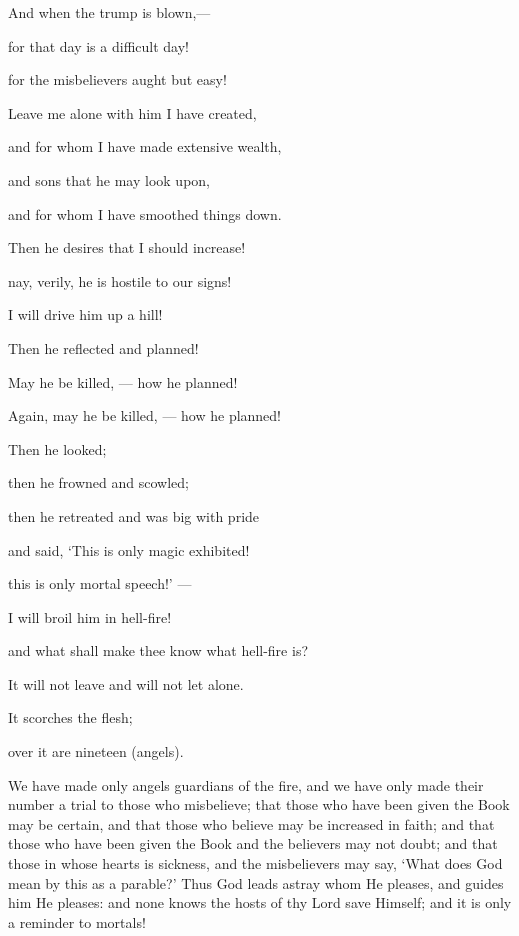 \documentclass[fontsize=14pt, letterpaper, notitlepage, openany, DIV=12]{scrbook} %
\begin{document}
\noindent[74:8]
And when the trump is blown,---

\noindent[74:9]
for that day is a difficult day!

\noindent[74:10]
for the misbelievers aught but easy!

\noindent[74:11]
Leave me alone with him I have created,

\noindent[74:12]
and for whom I have made extensive wealth,

\noindent[74:13]
and sons that he may look upon,

\noindent[74:14]
and for whom I have smoothed things down.

\noindent[74:15]
Then he desires that I should increase!

\noindent[74:16]
nay, verily, he is hostile to our signs!

\noindent[74:17]
I will drive him up a hill!

\noindent[74:18]
Then he reflected and planned!

\noindent[74:19]
May he be killed, --- how he planned!

\noindent[74:20]
Again, may he be killed, --- how he planned!

\noindent[74:21]
Then he looked;

\noindent[74:22]
then he frowned and scowled;

\noindent[74:23]
then he retreated and was big with pride

\noindent[74:24]
and said, `This is only magic exhibited!

\noindent[74:25]
this is only mortal speech!' ---

\noindent[74:26]
I will broil him in hell-fire!

\noindent[74:27]
and what shall make thee know what hell-fire is?

\noindent[74:28]
It will not leave and will not let alone.

\noindent[74:29]
It scorches the flesh;

\noindent[74:30]
over it are nineteen (angels).

\noindent[74:31]
We have made only angels guardians of the fire, and we have only made their number a
trial to those who misbelieve; that those who have been given the Book may be certain, and that
those who believe may be increased in faith; and that those who have been given the Book and
the believers may not doubt; and that those in whose hearts is sickness, and the misbelievers may
say, `What does God mean by this as a parable?' Thus God leads astray whom He pleases, and
guides him He pleases: and none knows the hosts of thy Lord save Himself; and it is only a
reminder to mortals!
\end{document}
